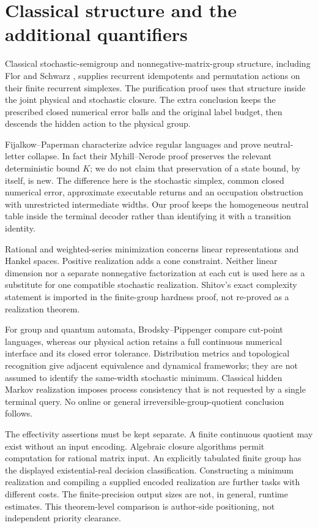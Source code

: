 \section{Classical structure and the additional quantifiers}
Classical stochastic-semigroup and nonnegative-matrix-group structure,
including Flor \cite{Flor} and Schwarz \cite{Schwarz58}, supplies recurrent
idempotents and permutation actions on their finite recurrent simplexes.
The purification proof uses that structure inside the joint physical and
stochastic closure. The extra conclusion keeps the prescribed closed
numerical error balls and the original label budget, then descends the
hidden action to the physical group.

Fijalkow--Paperman \cite[Theorems~1 and 10]{FP} characterize advice
regular languages and prove neutral-letter collapse. In fact their
Myhill--Nerode proof preserves the relevant deterministic bound $K$;
we do not claim that preservation of a state bound, by itself, is new.
The difference here is the stochastic simplex, common closed numerical
error, approximate executable returns and an occupation obstruction with
unrestricted intermediate widths. Our proof keeps the homogeneous
neutral table inside the terminal decoder rather than identifying it
with a transition identity.

Rational and weighted-series minimization \cite{BR,Paz} concerns linear
representations and Hankel spaces. Positive realization \cite{BF04}
adds a cone constraint. Neither linear dimension nor a separate
nonnegative factorization at each cut is used here as a substitute for
one compatible stochastic realization. Shitov's exact complexity
statement \cite[Theorem~2]{Shitov} is imported in the finite-group
hardness proof, not re-proved as a realization theorem.

For group and quantum automata, Brodsky--Pippenger
\cite[Theorems~3.3 and 3.6]{BP} compare cut-point languages, whereas our
physical action retains a full continuous numerical interface and its
closed error tolerance. Distribution metrics \cite{FSZ} and topological
recognition \cite{Steinberg} give adjacent equivalence and dynamical
frameworks; they are not assumed to identify the same-width stochastic
minimum. Classical hidden Markov realization \cite{Heller58} imposes
process consistency that is not requested by a single terminal query.
No online or general irreversible-group-quotient conclusion follows.

The effectivity assertions must be kept separate. A finite continuous
quotient may exist without an input encoding. Algebraic closure
algorithms permit computation for rational matrix input. An explicitly
tabulated finite group has the displayed existential-real decision
classification. Constructing a minimum realization and compiling a
supplied encoded realization are further tasks with different costs.
The finite-precision output sizes are not, in general, runtime estimates.
This theorem-level comparison is author-side positioning, not independent
priority clearance.

